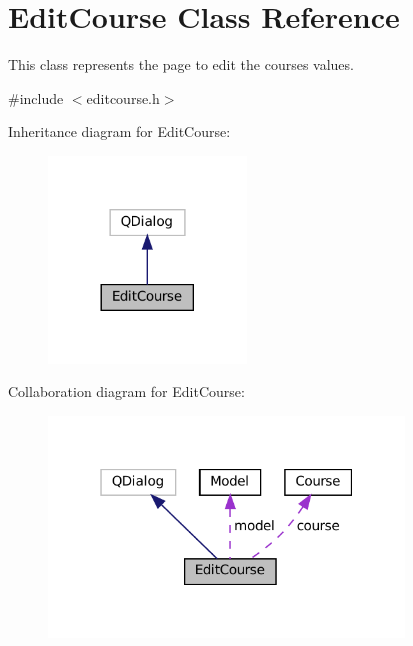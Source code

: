 \hypertarget{classEditCourse}{}\section{Edit\+Course Class Reference}
\label{classEditCourse}


This class represents the page to edit the course\textquotesingle{}s values.  




{\ttfamily \#include $<$editcourse.\+h$>$}



Inheritance diagram for Edit\+Course\+:
\nopagebreak
\begin{figure}[H]
\begin{center}
\leavevmode
\includegraphics[width=149pt]{classEditCourse__inherit__graph}
\end{center}
\end{figure}


Collaboration diagram for Edit\+Course\+:
\nopagebreak
\begin{figure}[H]
\begin{center}
\leavevmode
\includegraphics[width=268pt]{classEditCourse__coll__graph}
\end{center}
\end{figure}
